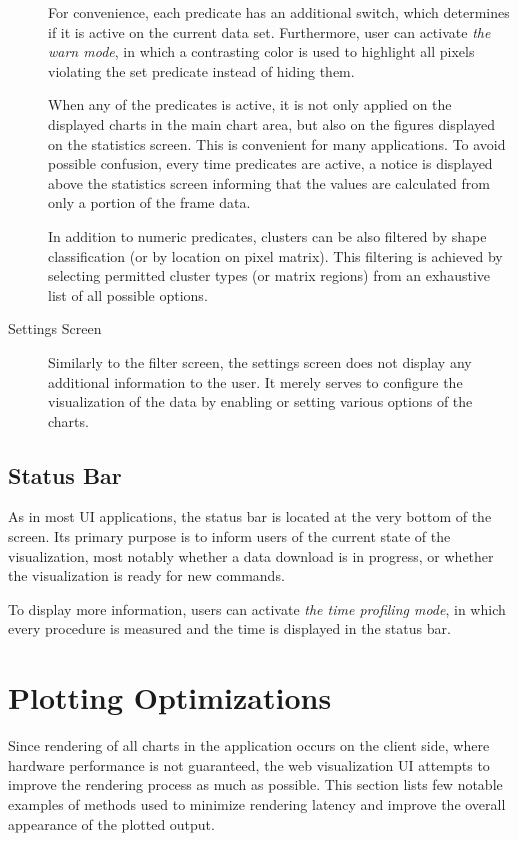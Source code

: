 \begin{description}
	For convenience, each predicate has an additional switch, which determines if it is active on the current data set. Furthermore, user can activate \textit{the warn mode}, in which a contrasting color is used to highlight all pixels violating the set predicate instead of hiding them.

	When any of the predicates is active, it is not only applied on the displayed charts in the main chart area, but also on the figures displayed on the statistics screen. This is convenient for many applications. To avoid possible confusion, every time predicates are active, a notice is displayed above the statistics screen informing that the values are calculated from only a portion of the frame data.

	In addition to numeric predicates, clusters can be also filtered by shape classification (or by location on pixel matrix). This filtering is achieved by selecting permitted cluster types (or matrix regions) from an exhaustive list of all possible options.

	\item[Settings Screen]
	Similarly to the filter screen, the settings screen does not display any additional information to the user. It merely serves to configure the visualization of the data by enabling or setting various options of the charts.
\end{description}

\subsection{Status Bar}
As in most UI applications, the status bar is located at the very bottom of the screen. Its primary purpose is to inform users of the current state of the visualization, most notably whether a data download is in progress, or whether the visualization is ready for new commands.

To display more information, users can activate \textit{the time profiling mode}, in which every procedure is measured and the time is displayed in the status bar.

\todo

\section{Plotting Optimizations}
Since rendering of all charts in the application occurs on the client side, where hardware performance is not guaranteed, the web visualization UI attempts to improve the rendering process as much as possible. This section lists few notable examples of methods used to minimize rendering latency and improve the overall appearance of the plotted output.

